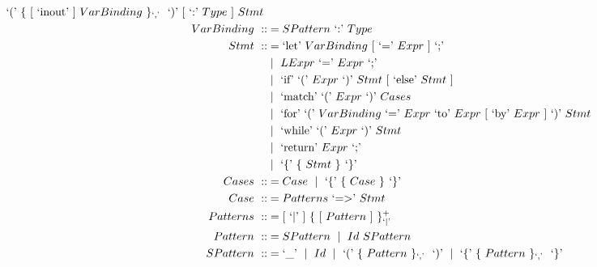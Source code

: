 \documentclass[letterpaper]{article}
\newcommand{\nonterminal}[1]{#1\ }
\newcommand{\terminal}[1]{\text{`#1'}\ }
\newcommand{\gramOption}[1]{[\ #1]\ }
\newcommand*{\gramRepeat}[2][]{\{\ #2\}_{#1}\ }
\newcommand*{\gramSome}[2][]{\{\ #2\}^{+}_{#1}\ }
\newcommand{\gramOr}{\mid\ }
\begin{document}
\begin{align*}
      \gramOption{\terminal{\textless}
        \gramRepeat[\terminal{,}]{\nonterminal{TypeVar}} \terminal{\textgreater}}
      \terminal{(} \gramRepeat[\terminal{,}]{\gramOption{\terminal{inout}}
        \nonterminal{VarBinding}} \terminal{)}
      \gramOption{\terminal{:} \nonterminal{Type}} \nonterminal{Stmt} \\
%
  \nonterminal{VarBinding} ::&= \nonterminal{SPattern} \terminal{:} \nonterminal{Type} \\
%
  \nonterminal{Stmt} ::&=
    \terminal{let} \nonterminal{VarBinding}
      \gramOption{\terminal{=} \nonterminal{Expr}} \terminal{;} \\
    &\gramOr \nonterminal{LExpr} \terminal{=} \nonterminal{Expr} \terminal{;} \\
    &\gramOr \terminal{if} \terminal{(} \nonterminal{Expr} \terminal{)}
      \nonterminal{Stmt} \gramOption{\terminal{else} \nonterminal{Stmt}} \\
    &\gramOr \terminal{match} \terminal{(} \nonterminal{Expr} \terminal{)} \nonterminal{Cases} \\
    &\gramOr \terminal{for} \terminal{(} \nonterminal{VarBinding} \terminal{=}
      \nonterminal{Expr} \terminal{to} \nonterminal{Expr}
      \gramOption{\terminal{by} \nonterminal{Expr}} \terminal{)} \nonterminal{Stmt} \\
    &\gramOr \terminal{while} \terminal{(} \nonterminal{Expr} \terminal{)}
      \nonterminal{Stmt} \\
    &\gramOr \terminal{return} \nonterminal{Expr} \terminal{;} \\
    &\gramOr \terminal{\{} \gramRepeat{\nonterminal{Stmt}} \terminal{\}} \\
%
  \nonterminal{Cases} ::&= \nonterminal{Case}
    \gramOr \terminal{\{} \gramRepeat{\nonterminal{Case}} \terminal{\}} \\
%
  \nonterminal{Case} ::&=
    \nonterminal{Patterns} \terminal{=\textgreater} \nonterminal{Stmt} \\
%
  \nonterminal{Patterns} ::&=
    \gramOption{\terminal{\textbar}}
      \gramSome[\terminal{\textbar}]{\gramOption{\nonterminal{Pattern}}} \\
%
  \nonterminal{Pattern} ::&= \nonterminal{SPattern}
    \gramOr \nonterminal{Id} \nonterminal{SPattern} \\
%
  \nonterminal{SPattern} ::&= \terminal{\textunderscore}
    \gramOr \nonterminal{Id}
    \gramOr \terminal{(} \gramRepeat[\terminal{,}]{\nonterminal{Pattern}} \terminal{)}
    \gramOr \terminal{\{} \gramRepeat[\terminal{,}]{\nonterminal{Pattern}} \terminal{\}} \\

\end{align*}
\end{document}
